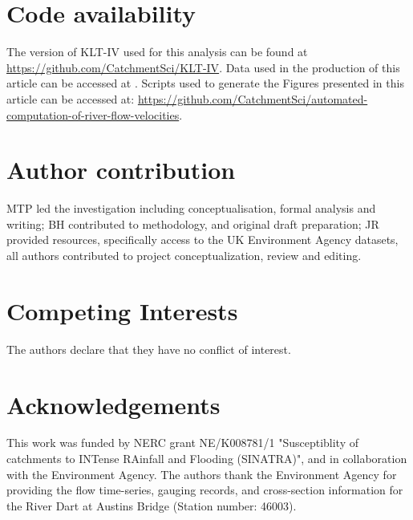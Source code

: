 \documentclass[hess, manuscript]{copernicus} %
\begin{document}
\section*{Code availability}
The version of KLT-IV used for this analysis can be found at \url{https://github.com/CatchmentSci/KLT-IV}. Data used in the production of this article can be accessed at \citet{Perks2024B}. Scripts used to generate the Figures presented in this article can be accessed at: \url{https://github.com/CatchmentSci/automated-computation-of-river-flow-velocities}.

\section*{Author contribution}
MTP led the investigation including conceptualisation, formal analysis and writing; BH contributed to methodology, and original draft preparation; JR provided resources, specifically access to the UK Environment Agency datasets, all authors contributed to project conceptualization, review and editing.

\section*{Competing Interests}
The authors declare that they have no conflict of interest.

\section*{Acknowledgements}
This work was funded by NERC grant NE/K008781/1 "Susceptiblity of catchments to INTense RAinfall and Flooding (SINATRA)", and in collaboration with the Environment Agency. The authors thank the Environment Agency for providing the flow time-series, gauging records, and cross-section information for the River Dart at Austins Bridge (Station number: 46003).








\end{document}

